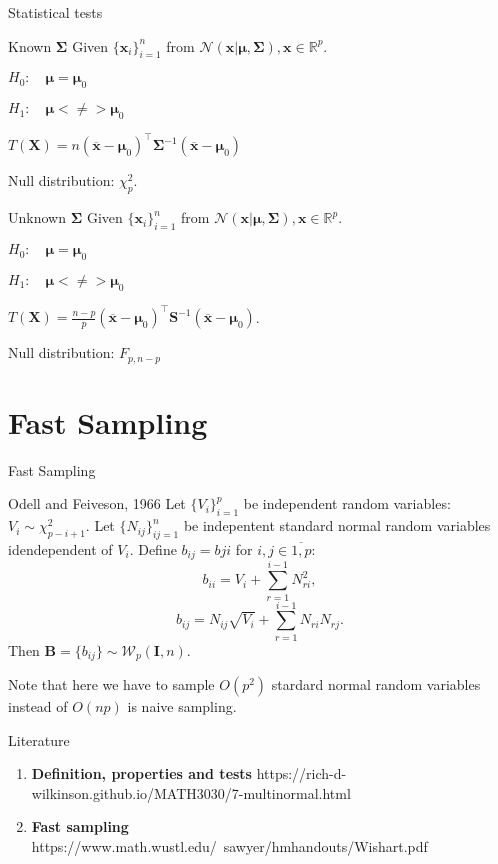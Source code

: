 \documentclass{beamer}
\begin{document}
\begin{frame}{Statistical tests}

    \begin{block}{Known $\mathbf{\Sigma}$}
        Given $\{\mathbf{x}_i\}_{i=1}^n$ from $\mathcal{N}(\mathbf{x}|\boldsymbol\mu, \mathbf{\Sigma}),
        \mathbf{x} \in \mathbb{R}^p$.

        $H_0: \quad \boldsymbol\mu = \boldsymbol\mu_0$

        $H_1: \quad \boldsymbol\mu <\not= > \boldsymbol\mu_0$

        $T(\mathbf{X}) = n(\overline{\mathbf{x}} - \boldsymbol\mu_0)^\top\mathbf{\Sigma}^{-1}(\overline{\mathbf{x}} - \boldsymbol\mu_0)$

        Null distribution: $\chi^2_p$.
    \end{block}

    \begin{block}{Unknown $\mathbf{\Sigma}$}
        Given $\{\mathbf{x}_i\}_{i=1}^n$ from $\mathcal{N}(\mathbf{x}|\boldsymbol\mu, \mathbf{\Sigma}),
        \mathbf{x} \in \mathbb{R}^p$.

        $H_0: \quad \boldsymbol\mu = \boldsymbol\mu_0$

        $H_1: \quad \boldsymbol\mu <\not= > \boldsymbol\mu_0$

        $T(\mathbf{X}) = \frac{n-p}{p}(\overline{\mathbf{x}} - \boldsymbol\mu_0)^\top\mathbf{S}^{-1}(\overline{\mathbf{x}} - \boldsymbol\mu_0)$.

        Null distribution: $F_{p, n-p}$

    \end{block}

\end{frame}


\section{Fast Sampling}

\begin{frame}{Fast Sampling}
    \begin{block}{Odell and Feiveson, 1966}
        Let $\{V_i\}_{i=1}^p$ be independent random variables: $V_i \sim \chi^2_{p - i + 1}$. Let $\{N_{ij}\}_{ij=1}^n$
        be indepentent standard normal random variables idendependent of $V_i$. Define $b_{ij} = b{ji}$ for $i, j \in \overline{1,p}$:
        \[
            b_{ii} = V_i + \sum_{r=1}^{i-1}N^2_{ri},
        \]
        \[
            b_{ij} = N_{ij}\sqrt{V_i} + \sum_{r=1}^{i-1}N_{ri}N_{rj}.
        \]
    Then $\mathbf{B} = \{b_{ij}\} \sim \mathcal{W}_p(\mathbf{I}, n)$.
    \end{block}
    Note that here we have to sample $O(p^2)$ stardard normal random variables instead of $O(np)$
    is naive sampling.
\end{frame}


\begin{frame}{Literature}
    \begin{enumerate}
        \item \textbf{Definition, properties and tests} https://rich-d-wilkinson.github.io/MATH3030/7-multinormal.html
        \item \textbf{Fast sampling} https://www.math.wustl.edu/~sawyer/hmhandouts/Wishart.pdf
    \end{enumerate}
\end{frame}
\end{document}

